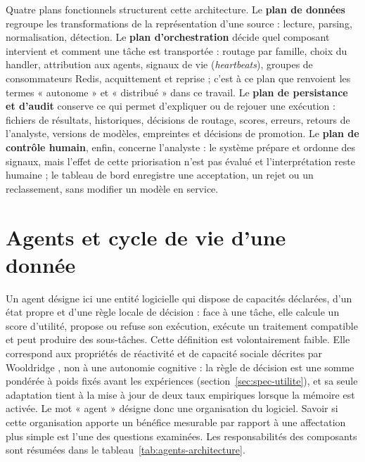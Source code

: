 Quatre plans fonctionnels structurent cette architecture. Le \textbf{plan de données} regroupe les transformations de la représentation d'une source : lecture, parsing, normalisation, détection. Le \textbf{plan d'orchestration} décide quel composant intervient et comment une tâche est transportée : routage par famille, choix du handler, attribution aux agents, signaux de vie (\textit{heartbeats}), groupes de consommateurs Redis, acquittement et reprise ; c'est à ce plan que renvoient les termes « autonome » et « distribué » dans ce travail. Le \textbf{plan de persistance et d'audit} conserve ce qui permet d'expliquer ou de rejouer une exécution : fichiers de résultats, historiques, décisions de routage, scores, erreurs, retours de l'analyste, versions de modèles, empreintes et décisions de promotion. Le \textbf{plan de contrôle humain}, enfin, concerne l'analyste : le système prépare et ordonne des signaux, mais l'effet de cette priorisation n'est pas évalué et l'interprétation reste humaine ; le tableau de bord enregistre une acceptation, un rejet ou un reclassement, sans modifier un modèle en service.

\section{Agents et cycle de vie d'une donnée}

\label{sec:agents-cycle}

Un agent désigne ici une entité logicielle qui dispose de capacités déclarées, d'un état propre et d'une règle locale de décision : face à une tâche, elle calcule un score d'utilité, propose ou refuse son exécution, exécute un traitement compatible et peut produire des sous-tâches. Cette définition est volontairement faible. Elle correspond aux propriétés de réactivité et de capacité sociale décrites par Wooldridge \cite{wooldridge2009introduction}, non à une autonomie cognitive : la règle de décision est une somme pondérée à poids fixés avant les expériences (section~\ref{sec:spec-utilite}), et sa seule adaptation tient à la mise à jour de deux taux empiriques lorsque la mémoire est activée. Le mot « agent » désigne donc une organisation du logiciel. Savoir si cette organisation apporte un bénéfice mesurable par rapport à une affectation plus simple est l'une des questions examinées. Les responsabilités des composants sont résumées dans le tableau~\ref{tab:agents-architecture}.

